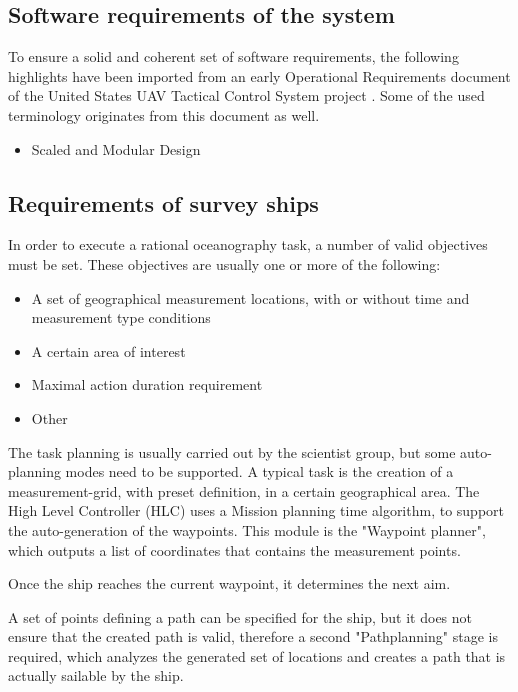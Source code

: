 \subsection{Software requirements of the system}

To ensure a solid and coherent set of software requirements, the following highlights have been imported from an early Operational Requirements document of the United States UAV Tactical Control System project \cite{uav}. Some of the used terminology originates from this document as well.

\begin{itemize}

\item Scaled and Modular Design

\end{itemize}

\subsection{Requirements of survey ships}

In order to execute a rational oceanography task, a number of valid objectives must be set. These objectives are usually one or more of the following\cite{oceanography}:

\begin{itemize}
\item A set of geographical measurement locations, with or without time and measurement type conditions
\item A certain area of interest
\item Maximal action duration requirement
\item Other
\end{itemize}

The task planning is usually carried out by the scientist group, but some auto-planning modes need to be supported. A typical task is the creation of a measurement-grid, with preset definition, in a certain geographical area. The High Level Controller (HLC) uses a Mission planning time algorithm, to support the auto-generation of the waypoints. This module is the "Waypoint planner", which outputs a list of coordinates that contains the measurement points.

Once the ship reaches the current waypoint, it determines the next aim.

A set of points defining a path can be specified for the ship, but it does not ensure that the created path is valid, therefore a second "Pathplanning" stage is required, which analyzes the generated set of locations and creates a path that is actually sailable by the ship.

